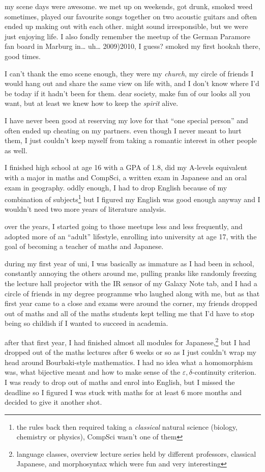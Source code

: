 \documentclass[12pt]{report}
\theoremstyle{definition}
\theoremstyle{remark}
\begin{document}
my scene days were awesome. we met up on weekends, got drunk, smoked weed sometimes, played our favourite songs together on two acoustic guitars and often ended up making out with each other. might sound irresponsible, but we were just enjoying life. I also fondly remember the meetup of the German Paramore fan board in Marburg in… uh… 2009)2010, I guess? smoked my first hookah there, good times.

I can't thank the emo scene enough, they were my \emph{church}, my circle of friends I would hang out and share the same view on life with, and I don't know where I'd be today if it hadn't been for them. dear society, make fun of our looks all you want, but at least we knew how to keep the \emph{spirit} alive.

I have never been good at reserving my love for that ``one special person'' and often ended up cheating on my partners. even though I never meant to hurt them, I just couldn't keep myself from taking a romantic interest in other people as well.

I finished high school at age 16 with a GPA of 1.8, did my A-levels equivalent with a major in maths and CompSci, a written exam in Japanese and an oral exam in geography. oddly enough, I had to drop English because of my combination of subjects\footnote{the rules back then required taking a \emph{classical} natural science (biology, chemistry or physics), CompSci wasn't one of them} but I figured my English was good enough anyway and I wouldn't need two more years of literature analysis.

over the years, I started going to those meetups less and less frequently, and adopted more of an ``adult'' lifestyle, enrolling into university at age 17, with the goal of becoming a teacher of maths and Japanese.

during my first year of uni, I was basically as immature as I had been in school, constantly annoying the others around me, pulling pranks like randomly freezing the lecture hall projector with the IR sensor of my Galaxy Note tab, and I had a circle of friends in my degree programme who laughed along with me, but as that first year came to a close and exams were around the corner, my friends dropped out of maths and all of the maths students kept telling me that I'd have to stop being so childish if I wanted to succeed in academia.

after that first year, I had finished almost all modules for Japanese,\footnote{language classes, overview lecture series held by different professors, classical Japanese, and morphosyntax which were fun and very interesting} but I had dropped out of the maths lectures after 6 weeks or so as I just couldn't wrap my head around Bourbaki-style mathematics. I had no idea what a homomorphism was, what bijective meant and how to make sense of the $\varepsilon,\delta$-continuity criterion. I was ready to drop out of maths and enrol into English, but I missed the deadline so I figured I was stuck with maths for at least 6 more months and decided to give it another shot.
\end{document}
